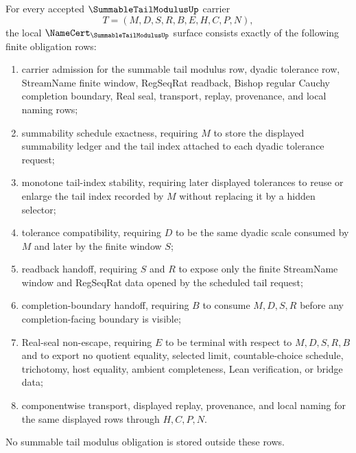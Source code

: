 \begin{theorem}
\label{thm:summable-tail-modulus-namecert-obligations}
For every accepted $\SummableTailModulusUp$ carrier
$$
T=(M,D,S,R,B,E,H,C,P,N),
$$
the local $\NameCert_{\SummableTailModulusUp}$ surface consists exactly of the following finite obligation rows:
\begin{enumerate}
\item carrier admission for the summable tail modulus row, dyadic tolerance row, StreamName finite window, RegSeqRat readback, Bishop regular Cauchy completion boundary, Real seal, transport, replay, provenance, and local naming rows;
\item summability schedule exactness, requiring $M$ to store the displayed summability ledger and the tail index attached to each dyadic tolerance request;
\item monotone tail-index stability, requiring later displayed tolerances to reuse or enlarge the tail index recorded by $M$ without replacing it by a hidden selector;
\item tolerance compatibility, requiring $D$ to be the same dyadic scale consumed by $M$ and later by the finite window $S$;
\item readback handoff, requiring $S$ and $R$ to expose only the finite StreamName window and RegSeqRat data opened by the scheduled tail request;
\item completion-boundary handoff, requiring $B$ to consume $M,D,S,R$ before any completion-facing boundary is visible;
\item Real-seal non-escape, requiring $E$ to be terminal with respect to $M,D,S,R,B$ and to export no quotient equality, selected limit, countable-choice schedule, trichotomy, host equality, ambient completeness, Lean verification, or bridge data;
\item componentwise transport, displayed replay, provenance, and local naming for the same displayed rows through $H,C,P,N$.
\end{enumerate}
No summable tail modulus obligation is stored outside these rows.
\end{theorem}
